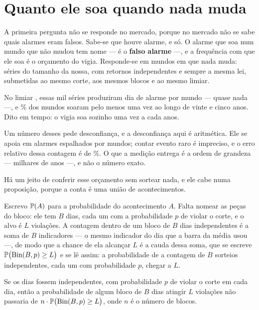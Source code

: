 \section{Quanto ele soa quando nada muda}

A primeira pergunta não se responde no mercado, porque no mercado não se sabe quais alarmes
eram falsos. Sabe-se que houve alarme, e só. O alarme que soa num mundo que não mudou tem nome
--- é o \textbf{falso alarme} ---, e a frequência com que ele soa é o orçamento do vigia.
Responde-se em mundos em que nada muda:
\numVigiaMundos{} séries do tamanho da nossa, com retornos independentes e sempre a mesma
lei, submetidas ao mesmo corte, aos mesmos blocos e ao mesmo limiar.

No limiar \numVigiaLimiar{}, essas mil séries produziram \numVigiaDiasParadoPorMundo{} dia de
alarme por mundo --- quase nada ---, e \numVigiaMundosQueSoamPct\% dos mundos soaram pelo
menos uma vez ao longo de vinte e cinco anos. Dito em tempo: o vigia soa sozinho uma vez a
cada \numVigiaAnosParadoPorAlarme{} anos.

Um número desses pede desconfiança, e a desconfiança aqui é aritmética. Ele se apoia em
\numVigiaParadoAlarmes{} alarmes espalhados por \numVigiaMundos{} mundos; contar evento raro
é impreciso, e o erro relativo dessa contagem é de \numVigiaParadoErroPct\%. O que a medição
entrega é a ordem de grandeza --- milhares de anos ---, e não o número exato.

Há um jeito de conferir esse orçamento sem sortear nada, e ele cabe numa proposição, porque a
conta é uma união de acontecimentos.

Escrevo $\mathbb{P}(A)$ para a probabilidade do acontecimento $A$. Falta nomear as peças do bloco:
ele tem $B$ dias, cada um com a probabilidade $p$ de violar o corte, e o alvo é $L$ violações.
A contagem dentro de um bloco de $B$ dias independentes é a soma de $B$ indicadores --- o mesmo indicador
do dia que a barra da média usou ---, de modo que a chance de ela alcançar $L$ é a cauda dessa soma, que se escreve
$\mathbb{P}\big(\text{Bin}(B, p) \geq L\big)$ e se lê assim: a probabilidade de a contagem de
$B$ sorteios independentes, cada um com probabilidade $p$, chegar a $L$.

\begin{proposicao}
\label{prop:teto}
Se os dias fossem independentes, com probabilidade $p$ de violar o corte em cada dia, então a
probabilidade de algum bloco de $B$ dias atingir $L$ violações não passaria de
$n \cdot \mathbb{P}\big(\text{Bin}(B, p) \geq L\big)$, onde $n$ é o número de blocos.
\end{proposicao}

